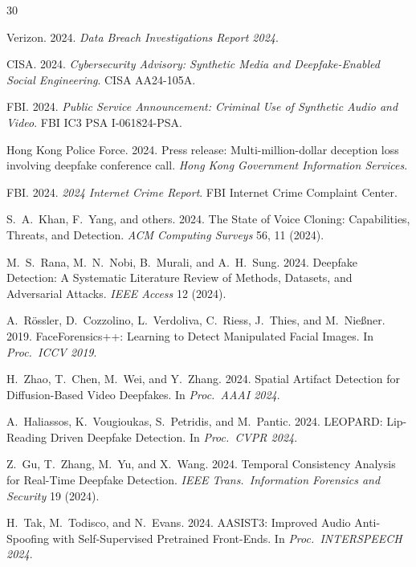 \documentclass[sigconf,nonacm]{acmart}
\begin{document}
\sloppy

\begin{thebibliography}{30}

Verizon. 2024. \textit{Data Breach Investigations Report 2024}.

CISA. 2024. \textit{Cybersecurity Advisory: Synthetic Media and
Deepfake-Enabled Social Engineering}. CISA AA24-105A.

FBI. 2024. \textit{Public Service Announcement: Criminal Use of
Synthetic Audio and Video}. FBI IC3 PSA I-061824-PSA.

Hong Kong Police Force. 2024. Press release: Multi-million-dollar
deception loss involving deepfake conference call.
\textit{Hong Kong Government Information Services}.

FBI. 2024. \textit{2024 Internet Crime Report}. FBI Internet Crime
Complaint Center.

S.~A.~Khan, F.~Yang, and others. 2024. The State of Voice Cloning:
Capabilities, Threats, and Detection.
\textit{ACM Computing Surveys} 56, 11 (2024).

M.~S.~Rana, M.~N.~Nobi, B.~Murali, and A.~H.~Sung. 2024. Deepfake
Detection: A Systematic Literature Review of Methods, Datasets, and
Adversarial Attacks. \textit{IEEE Access} 12 (2024).

A.~R\"ossler, D.~Cozzolino, L.~Verdoliva, C.~Riess, J.~Thies, and
M.~Nie\ss{}ner. 2019. FaceForensics++: Learning to Detect Manipulated
Facial Images. In \textit{Proc.\ ICCV 2019}.

H.~Zhao, T.~Chen, M.~Wei, and Y.~Zhang. 2024. Spatial Artifact
Detection for Diffusion-Based Video Deepfakes. In
\textit{Proc.\ AAAI 2024}.

A.~Haliassos, K.~Vougioukas, S.~Petridis, and M.~Pantic. 2024.
LEOPARD: Lip-Reading Driven Deepfake Detection.
In \textit{Proc.\ CVPR 2024}.

Z.~Gu, T.~Zhang, M.~Yu, and X.~Wang. 2024. Temporal Consistency
Analysis for Real-Time Deepfake Detection. \textit{IEEE Trans.\
Information Forensics and Security} 19 (2024).

H.~Tak, M.~Todisco, and N.~Evans. 2024. AASIST3: Improved Audio
Anti-Spoofing with Self-Supervised Pretrained Front-Ends.
In \textit{Proc.\ INTERSPEECH 2024}.


\end{thebibliography}
\end{document}
